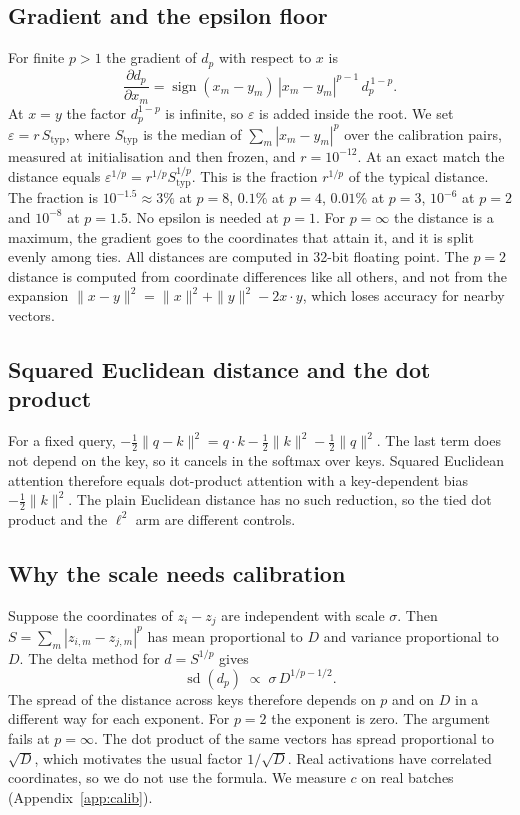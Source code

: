 \documentclass[11pt]{article}
\begin{document}
\subsection{Gradient and the epsilon floor}

For finite $p>1$ the gradient of $d_p$ with respect to $x$ is
\begin{equation}
\frac{\partial d_p}{\partial x_m}=\operatorname{sign}(x_m-y_m)\,|x_m-y_m|^{p-1}\,d_p^{\,1-p}.
\end{equation}
At $x=y$ the factor $d_p^{1-p}$ is infinite, so $\varepsilon$ is added inside the root.
We set $\varepsilon=r\,S_{\mathrm{typ}}$, where $S_{\mathrm{typ}}$ is the median of $\sum_m|x_m-y_m|^p$ over the calibration pairs, measured at initialisation and then frozen, and $r=10^{-12}$.
At an exact match the distance equals $\varepsilon^{1/p}=r^{1/p}S_{\mathrm{typ}}^{1/p}$.
This is the fraction $r^{1/p}$ of the typical distance.
The fraction is $10^{-1.5}\approx3\%$ at $p=8$, $0.1\%$ at $p=4$, $0.01\%$ at $p=3$, $10^{-6}$ at $p=2$ and $10^{-8}$ at $p=1.5$.
No epsilon is needed at $p=1$.
For $p=\infty$ the distance is a maximum, the gradient goes to the coordinates that attain it, and it is split evenly among ties.
All distances are computed in 32-bit floating point.
The $p=2$ distance is computed from coordinate differences like all others, and not from the expansion $\|x-y\|^2=\|x\|^2+\|y\|^2-2x\cdot y$, which loses accuracy for nearby vectors.

\subsection{Squared Euclidean distance and the dot product}\label{app:sq}

For a fixed query, $-\tfrac12\|q-k\|^2=q\cdot k-\tfrac12\|k\|^2-\tfrac12\|q\|^2$.
The last term does not depend on the key, so it cancels in the softmax over keys.
Squared Euclidean attention therefore equals dot-product attention with a key-dependent bias $-\tfrac12\|k\|^2$.
The plain Euclidean distance has no such reduction, so the tied dot product and the $\ell^2$ arm are different controls.

\subsection{Why the scale needs calibration}

Suppose the coordinates of $z_i-z_j$ are independent with scale $\sigma$.
Then $S=\sum_m|z_{i,m}-z_{j,m}|^p$ has mean proportional to $D$ and variance proportional to $D$.
The delta method for $d=S^{1/p}$ gives
\begin{equation}
\operatorname{sd}(d_p)\;\propto\;\sigma\,D^{1/p-1/2}.
\end{equation}
The spread of the distance across keys therefore depends on $p$ and on $D$ in a different way for each exponent.
For $p=2$ the exponent is zero.
The argument fails at $p=\infty$.
The dot product of the same vectors has spread proportional to $\sqrt{D}$, which motivates the usual factor $1/\sqrt{D}$.
Real activations have correlated coordinates, so we do not use the formula.
We measure $c$ on real batches (Appendix~\ref{app:calib}).
\end{document}

